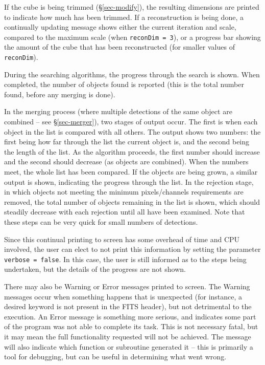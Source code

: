 If the cube is being trimmed (\S\ref{sec-modify}), the resulting
dimensions are printed to indicate how much has been trimmed. If a
reconstruction is being done, a continually updating message shows
either the current iteration and scale, compared to the maximum scale
(when \texttt{reconDim = 3}), or a progress bar showing the amount of
the cube that has been reconstructed (for smaller values of
\texttt{reconDim}).

During the searching algorithms, the progress through the search is
shown. When completed, the number of objects found is reported (this
is the total number found, before any merging is done).

In the merging process (where multiple detections of the same object
are combined -- see \S\ref{sec-merger}), two stages of output
occur. The first is when each object in the list is compared with all
others. The output shows two numbers: the first being how far through
the list the current object is, and the second being the length of the
list. As the algorithm proceeds, the first number should increase and
the second should decrease (as objects are combined). When the numbers
meet, the whole list has been compared. If the objects are being
grown, a similar output is shown, indicating the progress through the
list. In the rejection stage, in which objects not meeting the minimum
pixels/channels requirements are removed, the total number of objects
remaining in the list is shown, which should steadily decrease with
each rejection until all have been examined. Note that these steps can
be very quick for small numbers of detections.

Since this continual printing to screen has some overhead of time and
CPU involved, the user can elect to not print this information by
setting the parameter \texttt{verbose = false}. In this case, the user
is still informed as to the steps being undertaken, but the details of
the progress are not shown.

There may also be Warning or Error messages printed to screen. The
Warning messages occur when something happens that is unexpected (for
instance, a desired keyword is not present in the FITS header), but
not detrimental to the execution. An Error message is something more
serious, and indicates some part of the program was not able to
complete its task. This is not necessary fatal, but it may mean the
full functionality requested will not be achieved. The message will
also indicate which function or subroutine generated it -- this is
primarily a tool for debugging, but can be useful in determining what
went wrong.

